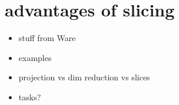 \section{advantages of slicing}
\label{sec:slicing-advantages}


\begin{itemize}
\tightlist
\item
  stuff from Ware
\item
  examples
\item
  projection vs dim reduction vs slices
\item
  tasks?
\end{itemize}


